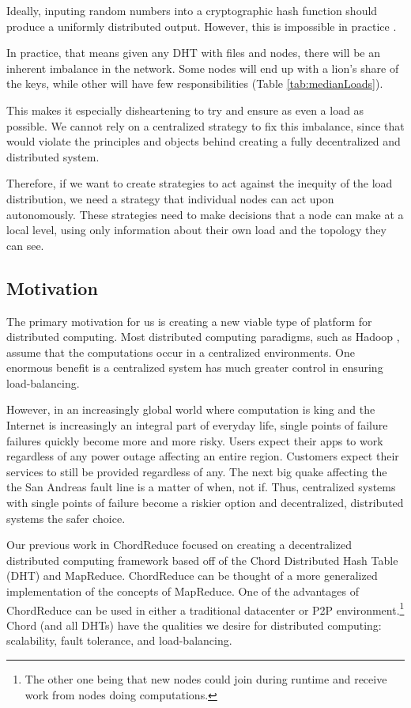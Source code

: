 \documentclass[11pt,conference]{IEEEtran}
\begin{document}
Ideally, inputing random numbers into a cryptographic hash function should produce a uniformly distributed output.
However, this is impossible in practice \cite{hash-outputs} \cite{thomsen2005cryptographic}.

In practice, that means given any DHT with files and nodes, there will be an inherent imbalance in the network.
Some nodes will end up with a lion's share of the keys, while other will have few responsibilities (Table \ref{tab:medianLoads}).


This makes it especially disheartening to try and ensure as even a load as possible.
We cannot rely on a centralized strategy to fix this imbalance, since that would violate the principles and objects behind creating a fully decentralized and distributed system.

Therefore, if we want to create strategies to act against the inequity of the load distribution, we need a strategy that individual nodes can act upon autonomously.
These strategies need to make decisions that a node can make at a local level, using only information about their own load and the topology they can see.


\subsection*{Motivation}
The primary motivation for us is creating a new viable type of platform for distributed computing.
Most distributed computing paradigms, such as Hadoop \cite{hadoop}, assume that the computations occur in a centralized environments.
One enormous benefit is a centralized system has much greater control in ensuring load-balancing.

However, in an increasingly global world where computation is king and the Internet is increasingly an integral part of everyday life, single points of failure failures quickly become more and more risky.
Users expect their apps to work regardless of any power outage affecting an entire region.
Customers expect their services to still be provided regardless of any.
The next big quake affecting the the San Andreas fault line is a matter of when, not if.
Thus, centralized systems with single points of failure become a riskier option and decentralized, distributed systems the safer choice.


Our previous work in ChordReduce \cite{chordreduce} focused on creating a decentralized distributed computing framework based off of the Chord Distributed Hash Table (DHT) and MapReduce.
ChordReduce can be thought of a more generalized implementation of the concepts of MapReduce.
One of the advantages of ChordReduce can be used in either a traditional datacenter or P2P environment.\footnote{The other one being that new nodes could join during runtime and receive work from nodes doing computations.}
Chord (and all DHTs) have the qualities we desire for distributed computing: scalability, fault tolerance, and load-balancing.
\end{document}
